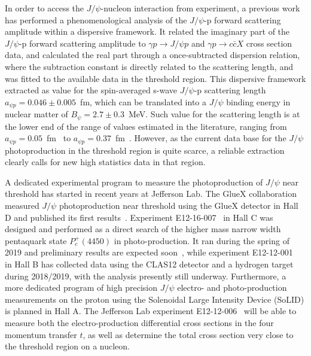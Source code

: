 \documentclass[prd,amsmath,%
twocolumn,floatfix,amssymb, preprintnumbers, nofootinbib, superscriptaddress]{revtex4}
\begin{document}
In order to access the $J/\psi$-nucleon interaction from experiment, a previous work~\cite{Gryniuk:2016mpk} has performed a phenomenological analysis of the $J/\psi$-p forward scattering amplitude within a dispersive framework.  It related the imaginary part of the $J/\psi$-p forward scattering amplitude 
to $\gamma p \to J/\psi p$ and $\gamma p \to c \bar c X$ cross section data, and calculated the real part through a once-subtracted dispersion relation, where the subtraction constant is directly related to the scattering length, and was fitted to the available data in the threshold region.   
This dispersive framework extracted as value for the spin-averaged s-wave $J/\psi$-p scattering length $a_{\psi p} = 0.046 \pm 0.005$~fm, which can be translated into a 
$J/\psi$ binding energy in nuclear matter 
of $B_{\psi} = 2.7 \pm 0.3$~MeV. Such value for the scattering length is at the lower end of the range of values estimated in the literature, ranging from 
$a_{\psi p} = 0.05$~fm~\cite{Kaidalov:1992hd} to 
$a_{\psi p} = 0.37$~fm~\cite{Sibirtsev:2005ex}. However, as the current data base for the $J/\psi$ photoproduction in the threshold region is quite scarce, a reliable extraction clearly calls for new high statistics data in that region.  

A dedicated experimental program to measure the  photoproduction of $J/\psi$ near threshold  has started in recent years at Jefferson Lab. The GlueX collaboration measured $J/\psi$ photoproduction near threshold using the GlueX detector in Hall D and published its first  results~\cite{Ali:2019lzf}. Experiment E12-16-007~\cite{Meziani:2016lhg} in Hall C was designed and performed as a direct search of the higher mass narrow width pentaquark state $P_c^+(4450)$ in photo-production. It ran during the spring of 2019 and preliminary results are expected soon~\cite{Joosten:2020}, while experiment E12-12-001~\cite{CLAS12-tcs:proposal} in Hall B has collected data using the CLAS12 detector and a hydrogen target during  2018/2019, with the analysis presently still underway. Furthermore, a more dedicated program of high precision $J/\psi$ electro- and photo-production  measurements on the proton  using the Solenoidal Large Intensity Device (SoLID) is planned in Hall A. The Jefferson Lab experiment E12-12-006~\cite{SoLIDjpsi:proposal} will be able to measure both the electro-production differential cross sections in the four momentum transfer $t$, as well as determine the total cross section very close to the threshold region on a nucleon.  
\end{document}
